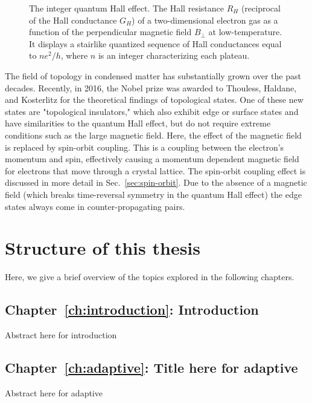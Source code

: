 \begin{figure}[!htb]
\centering
\caption{
The integer quantum Hall effect.
The Hall resistance $R_H$ (reciprocal of the Hall conductance $G_H$) of a two-dimensional electron gas as a function of the perpendicular magnetic field $B_\perp$ at low-temperature.
It displays a stairlike quantized sequence of Hall conductances equal to $ne^2/h$, where $n$ is an integer characterizing each plateau.
\label{fig:qhe}}
\end{figure}

The field of topology in condensed matter has substantially grown over the past decades.
Recently, in 2016, the Nobel prize was awarded to Thouless, Haldane, and Kosterlitz for the theoretical findings of topological states.
One of these new states are "topological insulators," which also exhibit edge or surface states and have similarities to the quantum Hall effect, but do not require extreme conditions such as the large magnetic field.
Here, the effect of the magnetic field is replaced by spin-orbit coupling.
This is a coupling between the electron's momentum and spin, effectively causing a momentum dependent magnetic field for electrons that move through a crystal lattice.
The spin-orbit coupling effect is discussed in more detail in Sec.~\ref{sec:spin-orbit}.
Due to the absence of a magnetic field (which breaks time-reversal symmetry in the quantum Hall effect) the edge states always come in counter-propagating pairs.


\section{Structure of this thesis}

Here, we give a brief overview of the topics explored in the following chapters.
\vspace{1mm}

\subsection{Chapter~\ref{ch:introduction}: Introduction}
Abstract here for introduction
\vspace{1mm}

\subsection{Chapter~\ref{ch:adaptive}: Title here for adaptive}
Abstract here for adaptive
\vspace{1mm}

